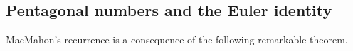\subsection{Pentagonal numbers and the Euler identity}
MacMahon's recurrence is a consequence of the following remarkable theorem.